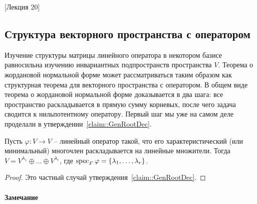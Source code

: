 [Лекция 20]


\subsection{Структура векторного пространства с оператором}

Изучение структуры матрицы линейного оператора в некотором базисе равносильна изучению инвариантных подпространств пространства $V$.
Теорема о жордановой нормальной форме может рассматриваться таким образом как структурная теорема для векторного пространства с оператором.
В общем виде теорема о жордановой нормальной форме доказывается в два шага: все пространство раскладывается в прямую сумму корневых, после чего задача сводится к нильпотентному оператору.
Первый шаг мы уже на самом деле проделали в утверждении~\ref{claim::GenRootDec}.

\begin{claim}
\label{claim::RootSpaceDec}
Пусть $\varphi\colon V\to V$ -- линейный оператор такой, что его характеристический (или минимальный) многочлен раскладывается на линейные множители.
Тогда $V = V^{\lambda_1} \oplus \ldots\oplus V^{\lambda_r}$, где $\operatorname{spec}_F \varphi = \{\lambda_1,\ldots, \lambda_r\}$.
\end{claim}
\begin{proof}
Это частный случай утверждения~\ref{claim::GenRootDec}.
\end{proof}

\paragraph{Замечание}

